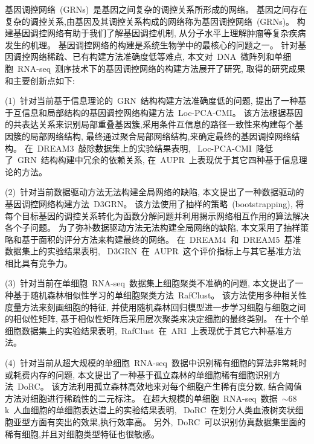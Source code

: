 \begin{abstractcn}\setlength{\baselineskip}{20pt}%
基因调控网络~(GRNs)~是基因之间复杂的调控关系所形成的网络。
基因之间存在复杂的调控关系,由基因及其调控关系构成的网络称为基因调控网络~(GRNs)。
构建基因调控网络有助于我们了解基因调控机制,
从分子水平上理解肿瘤等复杂疾病发生的机理。
基因调控网络的构建是系统生物学中的最核心的问题之一。
针对基因调控网络稀疏、已有构建方法准确度低等难点, 
本文对~DNA~微阵列和单细胞~RNA-seq~测序技术下的基因调控网络的构建方法展开了研究,
取得的研究成果和主要创新点如下:

(1)~针对当前基于信息理论的~GRN~结构构建方法准确度低的问题,
提出了一种基于互信息和局部结构的基因调控网络构建方法~Loc-PCA-CMI。
该方法根据基因的共表达关系来识别局部重叠基因簇,采用条件互信息的路径一致性来构建每个基因簇的局部网络结构,
最终通过聚合局部网络结构,来确定最终的基因调控网络结构。
在~DREAM3~敲除数据集上的实验结果表明,
~Loc-PCA-CMI~降低了~GRN~结构构建中冗余的依赖关系,
在~AUPR~上表现优于其它四种基于信息理论的方法。

(2)~针对当前数据驱动方法无法构建全局网络的缺陷,
本文提出了一种数据驱动的基因调控网络构建方法~D3GRN。
该方法使用了抽样的策略~(bootstrapping),
将每个目标基因的调控关系转化为函数分解问题并利用揭示网络相互作用的算法解决各个子问题。
为了弥补数据驱动方法无法构建全局网络的缺陷,
本文采用了抽样策略和基于面积的评分方法来构建最终的网络。
在~DREAM4~和~DREAM5~基准数据集上的实验结果表明,
~D3GRN~在~AUPR~这个评价指标上与其它基准方法相比具有竞争力。

(3)~针对当前在单细胞~RNA-seq~数据集上细胞聚类不准确的问题,
本文提出了一种基于随机森林相似性学习的单细胞聚类方法~RafClust。
该方法使用多种相关性度量方法来刻画细胞的特征, 
并使用随机森林回归模型进一步学习细胞与细胞之间的相似性矩阵,
基于相似性矩阵后采用层次聚类来决定细胞的最终类别。
在十个单细胞数据集上的实验结果表明,~RafClust~在~ARI~上表现优于其它六种基准方法。

(4)~针对当前从超大规模的单细胞~RNA-seq~数据中识别稀有细胞的算法非常耗时或耗费内存的问题,
本文提出了一种基于孤立森林的单细胞稀有细胞识别方法~DoRC。
该方法利用孤立森林高效地来对每个细胞产生稀有度分数,
结合阈值方法对细胞进行稀疏性的二元标注。
在超大规模的单细胞~RNA-seq~数据~${\sim}68$k~人血细胞的单细胞表达谱上的实验结果表明,
~DoRC~在划分人类血液树突状细胞亚型方面有突出的效果,执行效率高。
另外,~DoRC~可以识别仿真数据集里面的稀有细胞,并且对细胞类型特征也很敏感。


\end{abstractcn}

